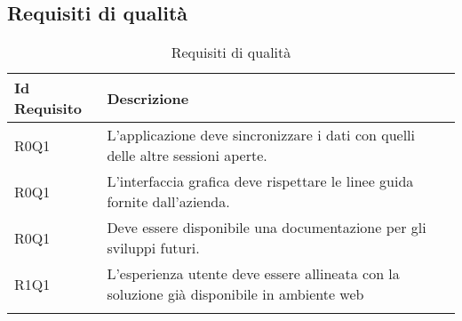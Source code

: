 \subsection{Requisiti di qualità}
\begin{longtable}{|C{3cm}|C{10cm}|}
	\hline
	\textbf{Id Requisito} & \textbf{Descrizione}\\
	\hline
	\endhead
	R0Q1 & L'applicazione deve sincronizzare i dati con quelli delle altre sessioni aperte.  \\ \hline 
	R0Q1 & L'interfaccia grafica deve rispettare le linee guida fornite dall'azienda.  \\ \hline 
	R0Q1 & Deve essere disponibile una documentazione per gli sviluppi futuri.  \\ \hline 
	R1Q1 & L'esperienza utente deve essere allineata con la soluzione già disponibile in ambiente web \\ \hline 
	\caption{Requisiti di qualità}
	\label{tabella:reqQ}
\end{longtable}

